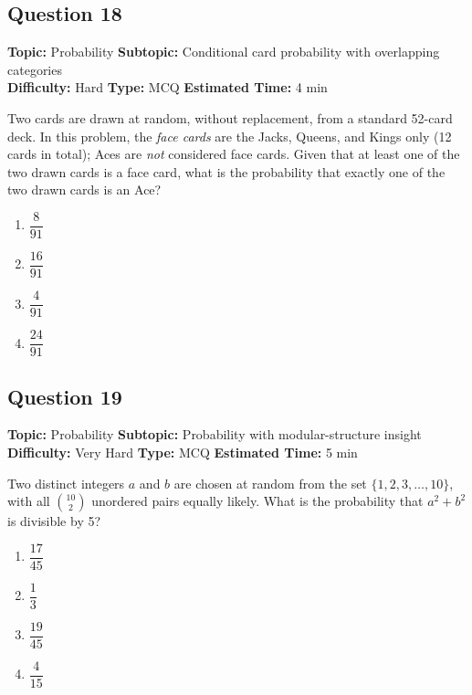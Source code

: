 \documentclass[11pt,a4paper]{article}
\begin{document}
\subsection*{Question 18}
\textbf{Topic:} Probability \quad
\textbf{Subtopic:} Conditional card probability with overlapping categories \\
\textbf{Difficulty:} Hard \quad
\textbf{Type:} MCQ \quad
\textbf{Estimated Time:} 4 min
\begin{tcolorbox}[qbox]
Two cards are drawn at random, without replacement, from a standard 52-card deck. In this problem, the \emph{face cards} are the Jacks, Queens, and Kings only (12 cards in total); Aces are \emph{not} considered face cards. Given that at least one of the two drawn cards is a face card, what is the probability that exactly one of the two drawn cards is an Ace?
\end{tcolorbox}
\begin{enumerate}[label=(\Alph*)]
\item \(\dfrac{8}{91}\)
\item \(\dfrac{16}{91}\)
\item \(\dfrac{4}{91}\)
\item \(\dfrac{24}{91}\)
\end{enumerate}

\subsection*{Question 19}
\textbf{Topic:} Probability \quad
\textbf{Subtopic:} Probability with modular-structure insight \\
\textbf{Difficulty:} Very Hard \quad
\textbf{Type:} MCQ \quad
\textbf{Estimated Time:} 5 min
\begin{tcolorbox}[qbox]
Two distinct integers \(a\) and \(b\) are chosen at random from the set \(\{1, 2, 3, \ldots, 10\}\), with all \(\binom{10}{2}\) unordered pairs equally likely. What is the probability that \(a^2 + b^2\) is divisible by 5?
\end{tcolorbox}
\begin{enumerate}[label=(\Alph*)]
\item \(\dfrac{17}{45}\)
\item \(\dfrac{1}{3}\)
\item \(\dfrac{19}{45}\)
\item \(\dfrac{4}{15}\)
\end{enumerate}
\end{document}
